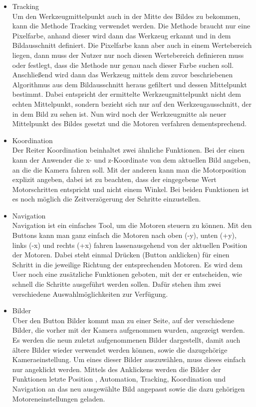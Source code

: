 \documentclass[12pt,a4paper,bibliography=totocnumbered,listof=totocnumbered]{scrartcl}
\begin{document}
\begin{itemize}
\begin{itemize}
\item Tracking\\
Um den Werkzeugmittelpunkt auch in der Mitte des Bildes zu bekommen, kann die Methode Tracking verwendet werden. Die Methode braucht nur eine Pixelfarbe, anhand dieser wird dann das Werkzeug erkannt und in dem Bildausschnitt definiert. Die Pixelfarbe kann aber auch in einem Wertebereich liegen, dann muss der Nutzer nur noch diesen Wertebereich definieren muss oder festlegt, dass die Methode nur genau nach dieser Farbe suchen soll. Anschließend wird dann das Werkzeug mittels dem zuvor beschriebenen Algorithmus aus dem Bildausschnitt heraus gefiltert und dessen Mittelpunkt bestimmt. Dabei entspricht der ermittelte Werkzeugmittelpunkt nicht dem echten Mittelpunkt, sondern bezieht sich nur auf den Werkzeugausschnitt, der in dem Bild zu sehen ist.  Nun  wird noch der Werkzeugmitte als neuer Mittelpunkt des Bildes gesetzt und die Motoren verfahren dementsprechend.
\item Koordination\\
Der Reiter \glqq Koordination\grqq{} beinhaltet zwei ähnliche Funktionen. Bei der einen kann der Anwender die x- und z-Koordinate von dem aktuellen Bild angeben, an die die Kamera fahren soll. Mit der anderen kann man die Motorposition explizit angeben, dabei ist zu beachten, dass der eingegebene Wert Motorschritten entspricht und nicht einem Winkel.
Bei beiden Funktionen ist es noch möglich die Zeitverzögerung der Schritte einzustellen.
\item Navigation\\
Navigation ist ein einfaches Tool, um die Motoren steuern zu können. Mit den Buttons kann man ganz einfach die Motoren nach oben (-y), unten (+y),  links (-x) und rechts (+x) fahren lassenausgehend von der aktuellen Position der Motoren. Dabei steht einmal Drücken (Button anklicken) für einen Schritt in die jeweilige Richtung der entsprechenden Motoren.
Es wird dem User noch eine zusätzliche Funktionen geboten, mit der er entscheiden, wie schnell die Schritte ausgeführt werden sollen. Dafür stehen ihm zwei verschiedene Auswahlmöglichkeiten zur Verfügung.
\item Bilder\\ 
Über den Button Bilder kommt man zu einer Seite, auf der verschiedene Bilder, die vorher mit der Kamera aufgenommen wurden, angezeigt werden. Es werden die neun zuletzt aufgenommenen Bilder dargestellt, damit auch ältere Bilder wieder verwendet werden können, sowie die dazugehörige Kameraeinstellung. Um eines dieser Bilder auszuwählen, muss dieses einfach nur angeklickt werden. Mittels des Anklickens werden die Bilder der Funktionen \glqq letzte Position \grqq{}, \glqq Automation\grqq{}, \glqq Tracking\grqq{}, \glqq Koordination\grqq{} und  \glqq Navigation\grqq{} an das neu ausgewählte Bild angepasst sowie die dazu gehörigen Motoreneinstellungen geladen.

\end{itemize}
\end{itemize}
\end{document}
